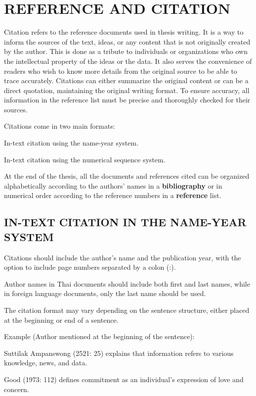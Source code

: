 \chapter{REFERENCE AND CITATION}

Citation refers to the reference documents used in thesis writing. It is a way to inform the sources of the text, ideas, or any content that is not originally created by the author. This is done as a tribute to individuals or organizations who own the intellectual property of the ideas or the data. It also serves the convenience of readers who wish to know more details from the original source to be able to trace accurately. Citations can either summarize the original content or can be a direct quotation, maintaining the original writing format. To ensure accuracy, all information in the reference list must be precise and thoroughly checked for their sources.

Citations come in two main formats:

In-text citation using the name-year system.

In-text citation using the numerical sequence system.

At the end of the thesis, all the documents and references cited can be organized alphabetically according to the authors' names in a \textbf{bibliography} or in numerical order according to the reference numbers in a \textbf{reference} list.

\section{IN-TEXT CITATION IN THE NAME-YEAR SYSTEM}

Citations should include the author's name and the publication year, with the option to include page numbers separated by a colon (:).

Author names in Thai documents should include both first and last names, while in foreign language documents, only the last name should be used.

The citation format may vary depending on the sentence structure, either placed at the beginning or end of a sentence.

Example (Author mentioned at the beginning of the sentence):

Suttilak Ampanswong (2521: 25) explains that information refers to various knowledge, news, and data.

Good (1973: 112) defines commitment as an individual's expression of love and concern.


